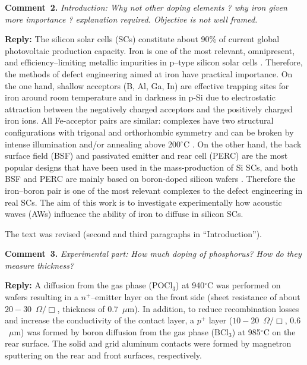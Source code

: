\documentclass[sn-mathphys]{sn-jnl}
\begin{document}
\vspace{1cm}
\noindent
\textcolor[rgb]{0.00,0.50,1.00}{\textbf{Comment~2.}}
\emph{Introduction: Why not other doping elements ?
 why iron given more importance ? explanation required. Objective is not well framed.}

\noindent
\textcolor[rgb]{0.51,0.00,0.00}{\textbf{Reply:}}
The silicon solar cells (SCs) constitute about 90\% of current global photovoltaic production capacity.
Iron is one of the most relevant, omnipresent, and efficiency--limiting metallic impurities
in p--type silicon solar cells \cite{Istratov1999,IronSC}.
Therefore, the methods of defect engineering aimed at iron have practical importance.
On the one hand, shallow acceptors (B, Al, Ga, In) are effective trapping sites for iron around room temperature
and in darkness in p-Si
due to electrostatic attraction between the negatively charged
acceptors and the positively charged iron ions.
All Fe-acceptor pairs are similar:
complexes have two structural configurations
with trigonal and orthorhombic symmetry and can be broken by
intense illumination and/or annealing above 200$^\circ$C \cite{Istratov1999,FeBKinAPL2013}.
On the other hand, the back surface field (BSF) and passivated emitter and rear cell (PERC)
are the most popular designs that have been used in the mass-production of Si SCs,
and both BSF and PERC are mainly  based on boron-doped silicon wafers \cite{SCRev2020,GreenRew2019}.
Therefore the iron--boron pair is one of the most relevant complexes to the defect engineering in real SCs.
The aim of this work is to investigate experimentally how acoustic waves (AWs) influence the ability of iron to diffuse in silicon SCs.

The text was revised
(second and third paragraphs in ``Introduction'').

\vspace{1cm}
\noindent
\textcolor[rgb]{0.00,0.50,1.00}{\textbf{Comment~3.}}
\emph{Experimental part: How much doping of phosphorus? How do they measure thickness?}

\noindent
\textcolor[rgb]{0.51,0.00,0.00}{\textbf{Reply:}}
A diffusion from the gas phase (POCl$_3$) at 940$^\circ$C was performed on wafers resulting in a $n^+$--emitter layer on
the front side (sheet resistance of about $20-30$~$\Omega/\Box$, thickness of $0.7$~$\mu$m).
In addition, to reduce recombination losses and increase the conductivity of the contact layer,
a $p^+$ layer ($10-20$~$\Omega/\Box$, $0.6$~$\mu$m) was formed by boron diffusion from
the gas phase (BCl$_3$) at 985$^\circ$C on the rear surface.
The solid and grid aluminum contacts were formed by magnetron sputtering on the rear and front surfaces, respectively.
\end{document}
